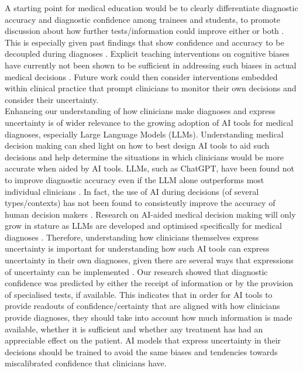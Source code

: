 \documentclass[a4paper, nobind]{templates/ociamthesis}
\begin{document}
A starting point for medical education would be to clearly differentiate diagnostic accuracy and diagnostic confidence among trainees and students, to promote discussion about how further tests/information could improve either or both \autocite{santhosh_diagnostic_2019}. This is especially given past findings that show confidence and accuracy to be decoupled during diagnoses \autocite{friedman_are_2001,yang_effect_2012,meyer_physicians_2013,garbayo_metacognitive_2023}. Explicit teaching interventions on cognitive biases have currently not been shown to be sufficient in addressing such biases in actual medical decisions \autocite{fraundorf_cognitive_2023}. Future work could then consider interventions embedded within clinical practice that prompt clinicians to monitor their own decisions and consider their uncertainty.\\

Enhancing our understanding of how clinicians make diagnoses and express uncertainty is of wider relevance to the growing adoption of AI tools for medical diagnoses, especially Large Language Models (LLMs). Understanding medical decision making can shed light on how to best design AI tools to aid such decisions and help determine the situations in which clinicians would be more accurate when aided by AI tools. LLMs, such as ChatGPT, have been found not to improve diagnostic accuracy even if the LLM alone outperforms most individual clinicians \autocite{goh_large_2024}. In fact, the use of AI during decisions (of several types/contexts) has not been found to consistently improve the accuracy of human decision makers \autocite{vaccaro_when_2024}. Research on AI-aided medical decision making will only grow in stature as LLMs are developed and optimised specifically for medical diagnoses \autocite{mcduff_towards_2023}. Therefore, understanding how clinicians themselves express uncertainty is important for understanding how such AI tools can express uncertainty in their own diagnoses, given there are several ways that expressions of uncertainty can be implemented \autocite{savage_large_2025}. Our research showed that diagnostic confidence was predicted by either the receipt of information or by the provision of specialised tests, if available. This indicates that in order for AI tools to provide readouts of confidence/certainty that are aligned with how clinicians provide diagnoses, they should take into account how much information is made available, whether it is sufficient and whether any treatment has had an appreciable effect on the patient. AI models that express uncertainty in their decisions should be trained to avoid the same biases and tendencies towards miscalibrated confidence that clinicians have.
\end{document}
